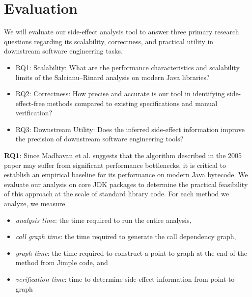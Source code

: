 
\section{Evaluation}

We will evaluate our side-effect analysis tool to answer three primary research questions regarding its scalability, correctness, and practical utility in downstream software engineering tasks.

\begin{itemize}
    \item RQ1: Scalability: What are the performance characteristics and scalability limits of the Salcianu--Rinard analysis on modern Java libraries?

    \item RQ2: Correctness: How precise and accurate is our tool in identifying side-effect-free methods compared to existing specifications and manual verification?

    \item RQ3: Downstream Utility: Does the inferred side-effect information improve the precision of downstream software engineering tools?
\end{itemize}

\textbf{RQ1}: Since Madhavan et al. \cite{MadhavanPurity2011} suggests that the algorithm described in the 2005 paper may suffer from significant performance bottlenecks, it is critical to establish an empirical baseline for its performance on modern Java bytecode. We evaluate our analysis on core JDK packages to determine the practical feasibility of this approach at the scale of standard library code. For each method we analyze, we measure  
\begin{itemize}  
\item \textit{analysis time}: the time required to run the entire analysis, 
\item \textit{call graph time}: the time required to generate the call dependency graph,
\item \textit{graph time}: the time required to construct a point-to graph at the end of the method from Jimple code, and
\item \textit{verification time}: time to determine side-effect information from point-to graph 
\end{itemize}

